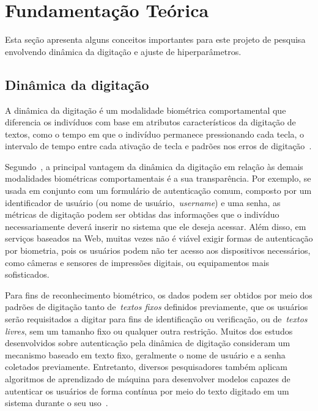 \section{Fundamentação Teórica}\label{sec:fundamentacao_teorica}

Esta seção apresenta alguns conceitos importantes para este projeto de pesquisa envolvendo dinâmica da digitação e ajuste de hiperparâmetros.


\subsection{Dinâmica da digitação}\label{subsec:dinamica_de_digitacao}

A dinâmica da digitação é um modalidade biométrica comportamental que diferencia os indivíduos com base em atributos característicos da digitação de textos, como o tempo em que o indivíduo permanece pressionando cada tecla, o intervalo de tempo entre cada ativação de tecla e padrões nos erros de digitação~\cite{biometric_personal_auth_using_keystroke_dynamics}.

Segundo~, a principal vantagem da dinâmica da digitação em relação às demais modalidades biométricas comportamentais é a sua transparência. Por exemplo, se usada em conjunto com um formulário de autenticação comum, composto por um identificador de usuário (ou nome de usuário,~\textit{username}) e uma senha, as métricas de digitação podem ser obtidas das informações que o indivíduo necessariamente deverá inserir no sistema que ele deseja acessar. Além disso, em serviços baseados na Web, muitas vezes não é viável exigir formas de autenticação por biometria, pois os usuários podem não ter acesso aos dispositivos necessários, como câmeras e sensores de impressões digitais, ou equipamentos mais sofisticados.

Para fins de reconhecimento biométrico, os dados podem ser obtidos por meio dos padrões de digitação tanto de~\textit{textos fixos} definidos previamente, que os usuários serão requisitados a digitar para fins de identificação ou verificação, ou de~\textit{textos livres}, sem um tamanho fixo ou qualquer outra restrição. Muitos dos estudos desenvolvidos sobre autenticação pela dinâmica de digitação consideram um mecanismo baseado em texto fixo, geralmente o nome de usuário e a senha coletados previamente. Entretanto, diversos pesquisadores também aplicam algoritmos de aprendizado de máquina para desenvolver modelos capazes de autenticar os usuários de forma contínua por meio do texto digitado em um sistema durante o seu uso~\cite{continuous_auth_by_free_text_keystroke_based_on_cnn_and_rnn}.


